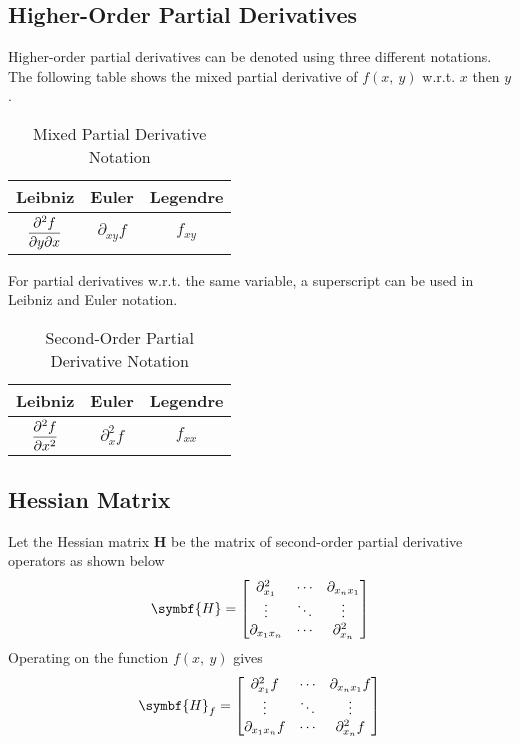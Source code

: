 \documentclass{article}
\begin{document}
\subsection{Higher-Order Partial Derivatives}
\begin{definition}
    Higher-order partial derivatives can be denoted using three different
    notations. The following table shows the mixed partial derivative of
    $f(x,\: y)$ w.r.t. $x$ then $y$.
    \begin{table}[H]
        \centering
        \begin{tabular}{c c c}
            \toprule
            \textbf{Leibniz} & \textbf{Euler} & \textbf{Legendre} \\
            \midrule
            $\displaystyle\pdv{f}{y}{x}$ & $\partial_{x y}{f}$ & $f_{x y}$ \\
            \bottomrule
        \end{tabular}
        \caption{Mixed Partial Derivative Notation}
    \end{table}
    For partial derivatives w.r.t. the same variable, a superscript can be used
    in Leibniz and Euler notation.
    \begin{table}[H]
        \centering
        \begin{tabular}{c c c}
            \toprule
            \textbf{Leibniz} & \textbf{Euler} & \textbf{Legendre} \\
            \midrule
            $\displaystyle\pdv[2]{f}{x}$ & $\partial^2_{x}{f}$ & $f_{x x}$ \\
            \bottomrule
        \end{tabular}
        \caption{Second-Order Partial Derivative Notation}
    \end{table}
\end{definition}
\subsection{Hessian Matrix}
\begin{definition}
    Let the Hessian matrix $\symbf{H}$ be the matrix of second-order partial
    derivative operators as shown below
    \begin{equation*}
        \symbf{H} =
        \mqty[
            \partial^2_{x_1} & \cdots & \partial_{x_nx_1} \\
            \vdots & \ddots & \vdots \\
            \partial_{x_1x_n} & \cdots & \partial^2_{x_n}
        ]
    \end{equation*}
    Operating on the function $f(x,\: y)$ gives
    \begin{equation*}
        \symbf{H}_f =
        \mqty[
            \partial^2_{x_1}f & \cdots & \partial_{x_nx_1}f \\
            \vdots & \ddots & \vdots \\
            \partial_{x_1x_n}f & \cdots & \partial^2_{x_n}f
        ]
    \end{equation*}
\end{definition}
\end{document}
